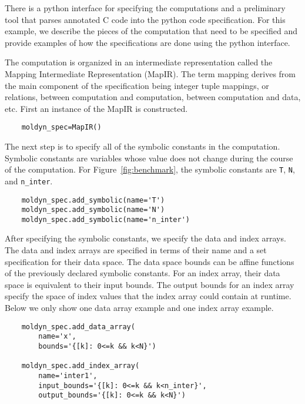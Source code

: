 \documentclass{article}
\begin{document}
There is a python interface for specifying the computations and a preliminary tool that 
parses annotated C code into the python code specification.  For this example, we describe 
the pieces of the computation that need to be specified and provide examples of how the
specifications are done using the python interface.

The computation is organized in an intermediate representation called the Mapping Intermediate Representation (MapIR).  The term mapping derives from the main component of the specification being integer tuple mappings, or relations, between computation and computation, between computation and data, etc.  First an instance of the MapIR is constructed.
\begin{verbatim}
    moldyn_spec=MapIR()
\end{verbatim}


The next step is to specify all of the symbolic constants in the computation.  Symbolic constants are variables whose value does not change during the course of the computation.  For Figure~\ref{fig:benchmark}, the symbolic constants are {\tt T}, {\tt N}, and {\tt n\_inter}.
\begin{verbatim}
    moldyn_spec.add_symbolic(name='T')
    moldyn_spec.add_symbolic(name='N')
    moldyn_spec.add_symbolic(name='n_inter')
\end{verbatim}

After specifying the symbolic constants, we specify the data and index arrays.
The data and index arrays are specified in terms of their name and a set 
specification for their data space.  
The data space bounds can be affine functions of the previously declared 
symbolic constants.
For an index array, their data space is equivalent to their input bounds.
The output bounds for an index array specify the space of index values
that the index array could contain at runtime.  
Below we only show one data array example and one
index array example.
\begin{verbatim}
    moldyn_spec.add_data_array(
        name='x',
        bounds='{[k]: 0<=k && k<N}')

    moldyn_spec.add_index_array(
        name='inter1',
        input_bounds='{[k]: 0<=k && k<n_inter}',
        output_bounds='{[k]: 0<=k && k<N}')
\end{verbatim}
\end{document}
